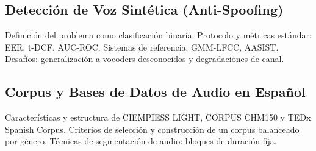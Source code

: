 \subsection{Detección de Voz Sintética (Anti-Spoofing)}
\label{sec:mt_antispoofing}
Definición del problema como clasificación binaria. Protocolo y métricas estándar: EER, t-DCF, AUC-ROC. Sistemas de referencia: GMM-LFCC, AASIST. Desafíos: generalización a vocoders desconocidos y degradaciones de canal.
 
\subsection{Corpus y Bases de Datos de Audio en Español}
\label{sec:mt_corpus}
Características y estructura de CIEMPIESS LIGHT, CORPUS CHM150 y TEDx Spanish Corpus. Criterios de selección y construcción de un corpus balanceado por género. Técnicas de segmentación de audio: bloques de duración fija.
 